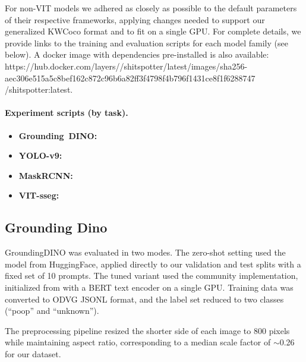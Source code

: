 For non-VIT models we adhered as closely as possible to the default parameters of their respective
  frameworks, applying changes needed to support our generalized KWCoco format and to fit on a single GPU.
For complete details, we provide links to the training and evaluation scripts for each model family (see
  below).
A docker image with dependencies pre-installed is also available:
\dockerimage
  {https://hub.docker.com/layers//shitspotter/latest/images/sha256-aec306e515a5c8bef162c872c96b6a82ff3f4798f4b796f1431ce8f1f6288747}
  {/shitspotter:latest}.

\paragraph{Experiment scripts (by task).}

\begin{itemize}
  \item \textbf{Grounding~DINO:} 

  \item \textbf{YOLO-v9:} 

  \item \textbf{MaskRCNN:} 

  \item \textbf{VIT-sseg:} 
\end{itemize}


\subsection{Grounding Dino}

GroundingDINO was evaluated in two modes.
The zero-shot setting used the  model from HuggingFace, applied
  directly to our validation and test splits with a fixed set of 10 prompts.
The tuned variant used the community  implementation, initialized from
  \DINOPretrained{} with a BERT text encoder on a single GPU.
Training data was converted to ODVG JSONL format, and the label set reduced to two classes (``poop'' and
  ``unknown'').

The preprocessing pipeline resized the shorter side of each image to 800 pixels while maintaining aspect
  ratio, corresponding to a median scale factor of $\sim$0.26 for our dataset.

